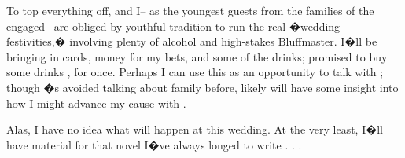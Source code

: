 \documentclass[char]{Kos}
\begin{document}
To top everything off, \cWard{\nickname} and I-- as the youngest guests from the families of the engaged-- are obliged by youthful tradition to run the real �wedding festivities,� involving plenty of alcohol and high-stakes Bluffmaster. I�ll be bringing in cards, money for my bets, and some of the drinks; \cWard{\nickname} promised to buy some drinks \cWard{\themselves}, for once. Perhaps I can use this as an opportunity to talk with \cWard{\nickname}; though \cWard{\they}�s avoided talking about \cWard{\their} family before, \cWard{\they} likely will have some insight into how I might advance my cause with \cBride{\nickname}.

Alas, I have no idea what will happen at this wedding. At the very least, I�ll have material for that novel I�ve always longed to write . . . 
\end{document}
